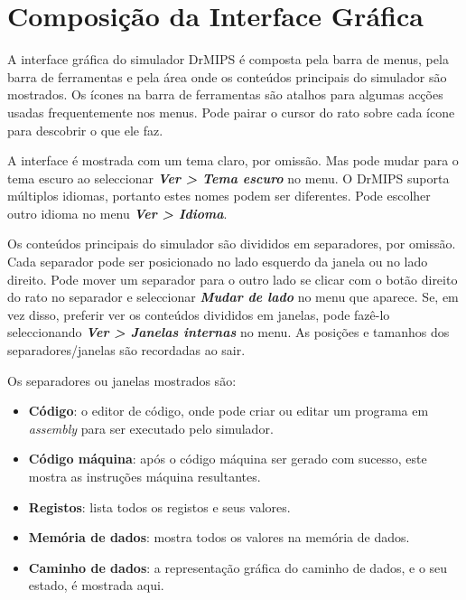 \documentclass[11pt,a4paper,twoside,titlepage]{article}
\author{Bruno Nova}
\title{\Title}
\newcommand{\menupath}[1]{\textbf{\emph{#1}}}
\begin{document}
\maketitle
\tableofcontents
\newpage


\section{Composição da Interface Gráfica}

A interface gráfica do simulador DrMIPS é composta pela barra de menus, pela
barra de ferramentas e pela área onde os conteúdos principais do simulador são
mostrados.
Os ícones na barra de ferramentas são atalhos para algumas acções usadas
frequentemente nos menus. Pode pairar o cursor do rato sobre cada ícone para
descobrir o que ele faz.

A interface é mostrada com um tema claro, por omissão. Mas pode mudar para o
tema escuro ao seleccionar \menupath{Ver > Tema escuro} no menu.
O DrMIPS suporta múltiplos idiomas, portanto estes nomes podem ser diferentes.
Pode escolher outro idioma no menu \menupath{Ver > Idioma}.

Os conteúdos principais do simulador são divididos em separadores, por omissão.
Cada separador pode ser posicionado no lado esquerdo da janela ou no lado 
direito.
Pode mover um separador para o outro lado se clicar com o botão direito do rato
no separador e seleccionar \menupath{Mudar de lado} no menu que aparece.
Se, em vez disso, preferir ver os conteúdos divididos em janelas, pode fazê-lo
seleccionando \menupath{Ver > Janelas internas} no menu.
As posições e tamanhos dos separadores/janelas são recordadas ao sair.

Os separadores ou janelas mostrados são:
\begin{itemize}
	\item \textbf{Código}: o editor de código, onde pode criar ou editar um
		programa em \emph{assembly} para ser executado pelo simulador.
	\item \textbf{Código máquina}: após o código máquina ser gerado com sucesso,
		este mostra as instruções máquina resultantes.
	\item \textbf{Registos}: lista todos os registos e seus valores.
	\item \textbf{Memória de dados}: mostra todos os valores na memória de 
		dados.
	\item \textbf{Caminho de dados}: a representação gráfica do caminho de
		dados, e o seu estado, é mostrada aqui.
\end{itemize}
\end{document}
